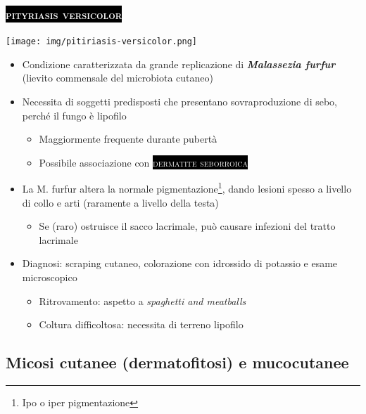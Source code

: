 \documentclass[italian,]{article}
\providecommand{\tightlist}{%
  \setlength{\itemsep}{0pt}\setlength{\parskip}{0pt}}
\newcommand{\pat}[1]{\colorbox{black}{\textcolor{white}{\textsc{#1}}}}
\begin{document}
\hypertarget{section-1}{%
\subsubsection{\texorpdfstring{\pat{pityriasis versicolor}}{}}\label{section-1}}

\texttt{[image: img/pitiriasis-versicolor.png]}~

\begin{itemize}
\tightlist
\item
  Condizione caratterizzata da grande replicazione di
  \textbf{\emph{Malassezia furfur}} (lievito commensale del microbiota
  cutaneo)
\item
  Necessita di soggetti predisposti che presentano sovraproduzione di
  sebo, perché il fungo è lipofilo

  \begin{itemize}
  \tightlist
  \item
    Maggiormente frequente durante pubertà
  \item
    Possibile associazione con \pat{dermatite seborroica}
  \end{itemize}
\item
  La M. furfur altera la normale pigmentazione\footnote{Ipo o iper
    pigmentazione}, dando lesioni spesso a livello di collo e arti
  (raramente a livello della testa)

  \begin{itemize}
  \tightlist
  \item
    Se (raro) ostruisce il sacco lacrimale, può causare infezioni del
    tratto lacrimale
  \end{itemize}
\item
  Diagnosi: scraping cutaneo, colorazione con idrossido di potassio e
  esame microscopico

  \begin{itemize}
  \tightlist
  \item
    Ritrovamento: aspetto a \emph{spaghetti and meatballs}
  \item
    Coltura difficoltosa: necessita di terreno lipofilo
  \end{itemize}
\end{itemize}

\hypertarget{micosi-cutanee-dermatofitosi-e-mucocutanee}{%
\subsection{Micosi cutanee (dermatofitosi) e
mucocutanee}\label{micosi-cutanee-dermatofitosi-e-mucocutanee}}
\end{document}
